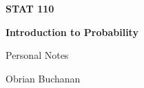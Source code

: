 \documentclass[11pt,letterpaper]{article}
\begin{document}
\hypersetup{pageanchor=false}
\begin{titlepage}
    \vspace*{\fill}
    \begin{center}
        {\Huge\bfseries\color{ink} STAT 110\par}
        \vspace{0.4cm}
        {\LARGE\bfseries\color{ink} Introduction to Probability\par}
        \vspace{1.2cm}
        {\Large Personal Notes\par}
        \vspace{0.6cm}
        {\large Obrian Buchanan\par}
    \end{center}
    \vspace*{\fill}
\end{titlepage}
\hypersetup{pageanchor=true}

{\setlength{\parskip}{0.3em}\tableofcontents}
\newpage

\setcounter{page}{1}
\setcounter{section}{1} %


\newpage

\newpage

\newpage

\end{document}
